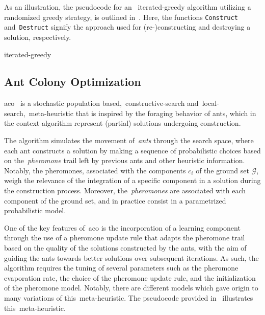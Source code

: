 As an illustration, the pseudocode for an ~\acrshort{iterated-greedy} algorithm
utilizing a randomized greedy strategy, is outlined
in~. Here, the functions \texttt{Construct}
and~\texttt{Destruct} signify the approach used for (re-)constructing and
destroying a solution, respectively.

\begin{algorithm}
  
  \caption{\acrlong{iterated-greedy}}
  \label{algorithm:iterated-greedy}
\end{algorithm}

\subsection{Ant Colony Optimization}
\label{subsec:aco}

\acrfull{aco}~\cite{dorigo2010anta,stutzle1999maxmin,luke2013essentialsa,blum2003metaheuristics}
is a stochastic population based,~\acrshort{constructive-search}
and~\acrshort{local-search},~\acrshort{meta-heuristic} that is inspired by the
foraging behavior of ants, which in the context algorithm represent (partial)
solutions undergoing construction.

The algorithm simulates the movement of~\textit{ants} through the search space,
where each ant constructs a solution by making a sequence of probabilistic
choices based on the~\textit{pheromone} trail left by previous ants and other
heuristic information. Notably, the pheromones, associated with the components
$c_{i}$ of the ground set $\mathcal{G}$, weigh the relevance of the integration
of a specific component in a solution during the construction process.
Moreover, the~\textit{pheromones} are associated with each component of the
ground set, and in practice consist in a parametrized probabilistic model.

One of the key features of~\acrshort{aco} is the incorporation of a learning component
through the use of a pheromone update rule that adapts the pheromone trail based
on the quality of the solutions constructed by the ants, with the aim of guiding
the ants towards better solutions over subsequent iterations. As such, the
algorithm requires the tuning of several parameters such as the pheromone
evaporation rate, the choice of the pheromone update rule, and the
initialization of the pheromone model. Notably, there are different models
which gave origin to many variations of this~\acrshort{meta-heuristic}.
The pseudocode provided in~ illustrates this~\acrshort{meta-heuristic}.

